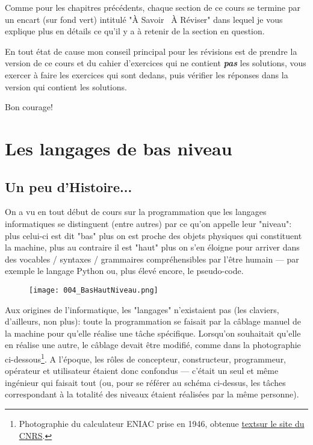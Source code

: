 \documentclass[12pt]{article}
\begin{document}
	 Comme pour les chapitres précédents, chaque section de ce cours se termine par un encart (sur fond vert) intitulé "À Savoir \faExchange \ À Réviser" dans lequel je vous explique plus en détails ce qu'il y a à retenir de la section en question.
	 
	 En tout état de cause mon conseil principal pour les révisions est de prendre la version de ce cours et du cahier d'exercices qui ne contient \textit{\textbf{pas}} les solutions, vous exercer à faire les exercices qui sont dedans, puis vérifier les réponses dans la version qui contient les solutions.
	 
	 Bon courage!
	 
	 \pagebreak
	
	 \section{Les langages de bas niveau}
	 
	 \subsection{Un peu d'Histoire...}
	 On a vu en tout début de cours sur la programmation que les langages informatiques se distinguent (entre autres) par ce qu'on appelle leur "niveau": plus celui-ci est dit "bas" plus on est proche des objets physiques qui constituent la machine, plus au contraire il est "haut" plus on s'en éloigne pour arriver dans des vocables / syntaxes / grammaires compréhensibles par l'être humain --- par exemple le langage Python ou, plus élevé encore, le pseudo-code.
	 
	 \begin{figure}[H]
	 	\centering
	 	\texttt{[image: 004\_BasHautNiveau.png]}
	 \end{figure}
	 
	 Aux origines de l'informatique, les "langages" n'existaient pas (les claviers, d'ailleurs, non plus): toute la programmation se faisait par la câblage manuel de la machine pour qu'elle réalise une tâche spécifique. Lorsqu'on souhaitait qu'elle en réalise une autre, le câblage devait être modifié, comme dans la photographie ci-dessous\footnote{Photographie du calculateur ENIAC prise en 1946, obtenue \href{https://lejournal.cnrs.fr/sites/default/files/styles/lightbox-hd/public/assets/images/1946_eniac_iv_72dpi.jpg?itok=Y1FhKfw_}{textsur le site du CNRS}.}. A l'époque, les rôles de concepteur, constructeur, programmeur, opérateur et utilisateur étaient donc confondus --- c'était un seul et même ingénieur qui faisait tout (ou, pour se référer au schéma ci-dessus, les tâches correspondant à la totalité des niveaux étaient réalisées par la même personne).
\end{document}
